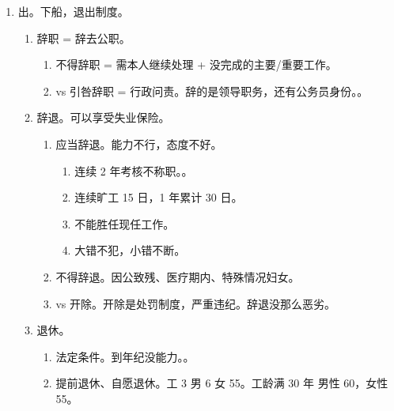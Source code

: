 \begin{enumerate}
\begin{enumerate}
\begin{enumerate}
                  \item 外部平级转任。。
                  \item 遴选。下到上。。
                \end{enumerate}
          \item 调任。长和爽。。
          \item 挂职/挂职锻炼。不再归为交流制度。临时镀金的。
        \end{enumerate}
  \item 出。下船，退出制度。
        \begin{enumerate}
          \item 辞职 = 辞去公职。
                \begin{enumerate}
                  \item 不得辞职 = 需本人继续处理 + 没完成的主要/重要工作。
                  \item vs 引咎辞职 = 行政问责。辞的是领导职务，还有公务员身份。。
                \end{enumerate}
          \item 辞退。可以享受失业保险。
                \begin{enumerate}
                  \item 应当辞退。能力不行，态度不好。
                        \begin{enumerate}
                          \item 连续 2 年考核不称职。。
                          \item 连续旷工 15 日，1 年累计 30 日。
                          \item 不能胜任现任工作。
                          \item 大错不犯，小错不断。
                        \end{enumerate}
                  \item 不得辞退。因公致残、医疗期内、特殊情况妇女。
                  \item vs 开除。开除是处罚制度，严重违纪。辞退没那么恶劣。
                \end{enumerate}
          \item 退休。
                \begin{enumerate}
                  \item 法定条件。到年纪没能力。。
                  \item 提前退休、自愿退休。工 3 男 6 女 55。工龄满 30 年 \hz 男性 60，女性 55。

\end{enumerate}
\end{enumerate}
\end{enumerate}
